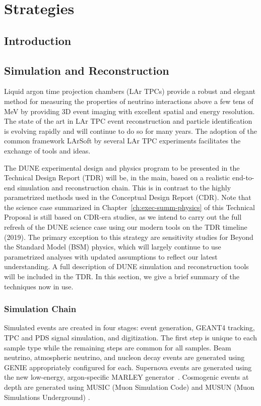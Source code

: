 \chapter{Strategies}
\label{ch:exec-summ-strat}

\section{Introduction}
\label{sec:exec-summ-strat-intro}

\section{Simulation and Reconstruction}
\label{sec:exec-summ-strat-simreco}

Liquid argon time projection chambers (LAr TPCs) provide a robust and elegant method for measuring the properties of neutrino interactions above a few tens of MeV by providing 3D event imaging with excellent spatial and energy resolution.  The state of the art in LAr TPC event reconstruction and particle identification is evolving rapidly and will continue to do so for many years.  The adoption of the common framework LArSoft by several LAr TPC experiments facilitates the exchange of tools and ideas.

The DUNE experimental design and physics program to be presented in the Technical Design Report (TDR) will be, in the main, based on a realistic end-to-end simulation and reconstruction chain.  This is in contrast to the highly parametrized methods used in the Conceptual Design Report (CDR).  Note that the science case summarized in Chapter~\ref{ch:exec-summ-physics} of this Technical Proposal is still based on CDR-era studies, as we intend to carry out the full refresh of the DUNE science case using our modern tools on the TDR timeline (2019).  The primary exception to this strategy are sensitivity studies for Beyond the Standard Model (BSM) physics, which will largely continue to use parametrized analyses with updated assumptions to reflect our latest understanding.  A full description of DUNE simulation and reconstruction tools will be included in the TDR.  In this section, we give a brief summary of the techniques now in use.

\subsection{Simulation Chain}
Simulated events are created in four stages: event generation, {\sc GEANT4} tracking, TPC and PDS signal simulation, and digitization.  The first step is unique to each sample type while the remaining steps are common for all samples. Beam neutrino, atmospheric neutrino, and nucleon decay events are generated using {\sc GENIE} appropriately configured for each.  Supernova events are generated using the new low-energy, argon-specific MARLEY generator~\cite{marley}.  Cosmogenic events at depth are generated using MUSIC (Muon Simulation Code) \cite{MUSICPaper} and MUSUN (Muon Simulations Underground) \cite{Kudryavtsev:musun}.

